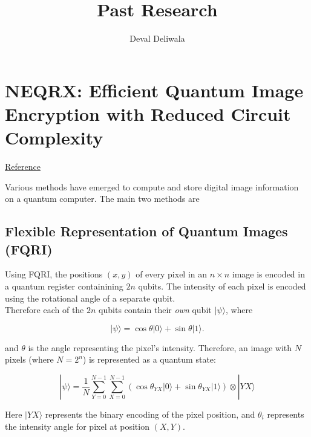 \documentclass[svgnames]{article}     %
\title{Past Research}
\author{Deval Deliwala}
\begin{document}
\maketitle


\section{NEQRX: Efficient Quantum Image Encryption with Reduced Circuit
Complexity} 

\href{https://arxiv.org/pdf/2204.07996}{Reference} 

\vspace{10px}

Various methods have emerged to compute and store digital image information on
a quantum computer. The main two methods are 

\subsection{Flexible Representation of Quantum Images (FQRI)} 

Using FQRI, the positions $(x, y)$ of every pixel in an $n\times n$ image is encoded in a quantum
register containining $2n$ qubits. The intensity of each pixel is encoded using
the rotational angle of a separate qubit. \\

Therefore each of the $2n$ qubits contain their \textit{own} qubit
$|\psi\rangle$, where 

\[
|\psi\rangle = \cos\theta |0\rangle + \sin\theta | 1 \rangle.
\] \vspace{3px}

and $\theta$ is the angle representing the pixel's intensity. Therefore, an
image with $N$ pixels (where $N = 2^n$) is represented as a quantum state: 

\[
|\psi\rangle = \frac{1}{N}\sum_{Y=0}^{N-1} \sum_{X=0}^{N-1} \left(
  \cos\theta_{YX} 
| 0 \rangle + \sin\theta_{YX} | 1 \rangle\right) \otimes |YX\rangle
\] \vspace{3px}

Here $|YX\rangle$ represents the binary encoding of the pixel position, and
$\theta_i$ represents the intensity angle for pixel at position $(X, Y)$. 
\end{document}
